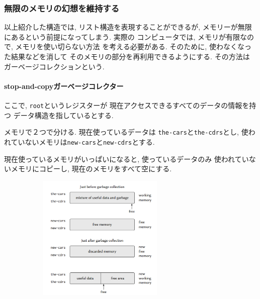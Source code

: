 \subsubsection{無限のメモリの幻想を維持する}
以上紹介した構造では, リスト構造を表現することができるが,
メモリーが無限にあるという前提になってしまう. 実際の%
コンピュータでは, メモリが有限なので, メモリを使い切らない方法%
を考える必要がある. そのために, 使わなくなった結果などを消して%
そのメモリの部分を再利用できるようにする. その方法は
ガーベージコレクションという.

\paragraph{stop-and-copyガーベージコレクター}
ここで, \lstinline{root}というレジスターが%
現在アクセスできるすべてのデータの情報を持つ%
データ構造を指しているとする.

メモリで２つで分ける. 現在使っているデータは%
\lstinline{the-cars}と\lstinline{the-cdrs}とし,
使われていないメモリは\lstinline{new-cars}と\lstinline{new-cdrs}とする.

現在使っているメモリがいっぱいになると, 使っているデータのみ
使われていないメモリにコピーし, 現在のメモリをすべて空にする.

\begin{figure}[h]
  \centering
  \includegraphics[height=6cm,width=8cm]{imgs/stop-and-copy.png}
\end{figure}
